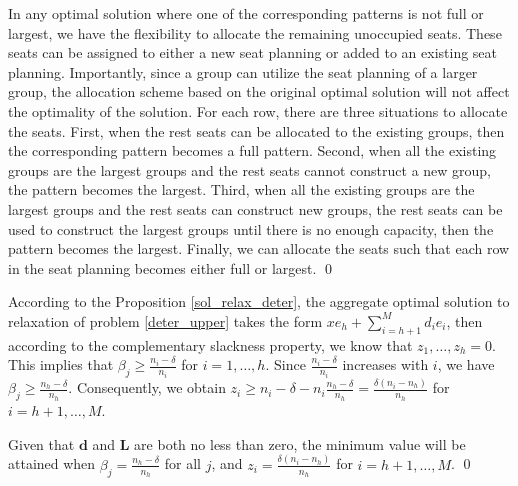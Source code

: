 \begin{pf}
In any optimal solution where one of the corresponding patterns is not full or largest, we have the flexibility to allocate the remaining unoccupied seats. These seats can be assigned to either a new seat planning or added to an existing seat planning. Importantly, since a group can utilize the seat planning of a larger group, the allocation scheme based on the original optimal solution will not affect the optimality of the solution. 
For each row, there are three situations to allocate the seats. First, when the rest seats can be allocated to the existing groups, then the corresponding pattern becomes a full pattern. Second, when all the existing groups are the largest groups and the rest seats cannot construct a new group, the pattern becomes the largest. Third, when all the existing groups are the largest groups and the rest seats can construct new groups, the rest seats can be used to construct the largest groups until there is no enough capacity, then the pattern becomes the largest. Finally, we can allocate the seats such that each row in the seat planning becomes either full or largest. \qed
\end{pf}

\begin{pf}
  According to the Proposition \ref{sol_relax_deter}, the aggregate optimal solution to relaxation of problem \eqref{deter_upper} takes the form $x e_{h} + \sum_{i=h+1} ^{M} d_{i} e_{i}$, then according to the complementary slackness property, we know that $z_1, \ldots, z_h = 0$. This implies that $\beta_j \geq \frac{n_i - \delta}{n_i}$ for $i = 1,\ldots, h$. Since $\frac{n_i - \delta}{n_i}$ increases with $i$, we have $\beta_j \geq \frac{n_h - \delta}{n_h}$. Consequently, we obtain $z_{i} \geq n_i - \delta - n_i \frac{n_h - \delta}{n_h} = \frac{\delta(n_i-n_h)}{n_h}$ for $i = h+1, \ldots, M$.
  
  Given that $\mathbf{d}$ and $\mathbf{L}$ are both no less than zero, the minimum value will be attained when $\beta_j = \frac{n_h - \delta}{n_h}$ for all $j$, and $z_i = \frac{\delta(n_i-n_h)}{n_h}$ for $i = h+1, \ldots, M$.  \qed
\end{pf}


\newpage

